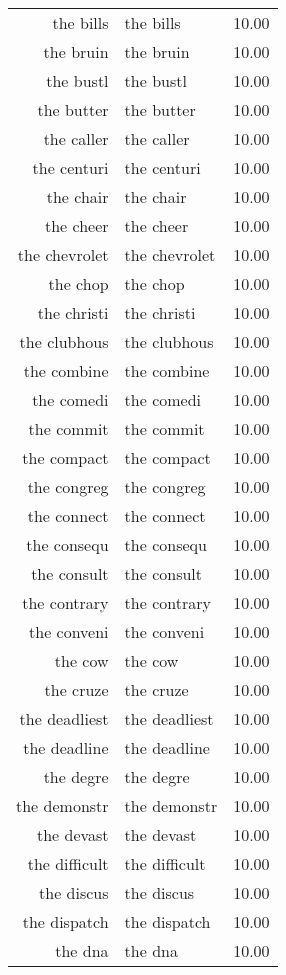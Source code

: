 \begin{table}[ht]
\begin{tabular}{rlr}
  the bills & the bills & 10.00 \\ 
  the bruin & the bruin & 10.00 \\ 
  the bustl & the bustl & 10.00 \\ 
  the butter & the butter & 10.00 \\ 
  the caller & the caller & 10.00 \\ 
  the centuri & the centuri & 10.00 \\ 
  the chair & the chair & 10.00 \\ 
  the cheer & the cheer & 10.00 \\ 
  the chevrolet & the chevrolet & 10.00 \\ 
  the chop & the chop & 10.00 \\ 
  the christi & the christi & 10.00 \\ 
  the clubhous & the clubhous & 10.00 \\ 
  the combine & the combine & 10.00 \\ 
  the comedi & the comedi & 10.00 \\ 
  the commit & the commit & 10.00 \\ 
  the compact & the compact & 10.00 \\ 
  the congreg & the congreg & 10.00 \\ 
  the connect & the connect & 10.00 \\ 
  the consequ & the consequ & 10.00 \\ 
  the consult & the consult & 10.00 \\ 
  the contrary & the contrary & 10.00 \\ 
  the conveni & the conveni & 10.00 \\ 
  the cow & the cow & 10.00 \\ 
  the cruze & the cruze & 10.00 \\ 
  the deadliest & the deadliest & 10.00 \\ 
  the deadline & the deadline & 10.00 \\ 
  the degre & the degre & 10.00 \\ 
  the demonstr & the demonstr & 10.00 \\ 
  the devast & the devast & 10.00 \\ 
  the difficult & the difficult & 10.00 \\ 
  the discus & the discus & 10.00 \\ 
  the dispatch & the dispatch & 10.00 \\ 
  the dna & the dna & 10.00 \\ 

\end{tabular}
\end{table}
